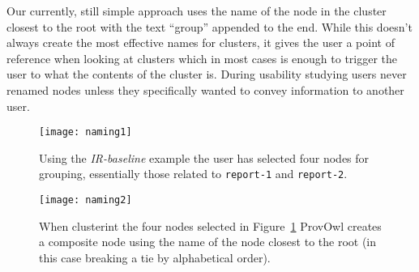 Our currently, still simple approach uses the name of the node in the cluster closest to the root with the text ``group'' appended to the end. While this doesn't always create the most effective names for clusters, it gives the user a point of reference when looking at clusters which in most cases is enough to trigger the user to what the contents of the cluster is. During usability studying users never renamed nodes unless they specifically wanted to convey information to another user.

\begin{figure}[h]
	\centering
	\texttt{[image: naming1]}
	\caption{Using the \textit{IR-baseline} example the user has selected four nodes for grouping, essentially those related to \texttt{report-1} and \texttt{report-2}.}
	\label{fig:naming1}
\end{figure}
\begin{figure}[h]
	\centering
	\texttt{[image: naming2]}
	\caption{When clusterint the four nodes selected in Figure~\ref{fig:naming1} ProvOwl creates a composite node using the name of the node closest to the root (in this case breaking a tie by alphabetical order).}
	\label{fig:naming2}
\end{figure}
\clearpage

